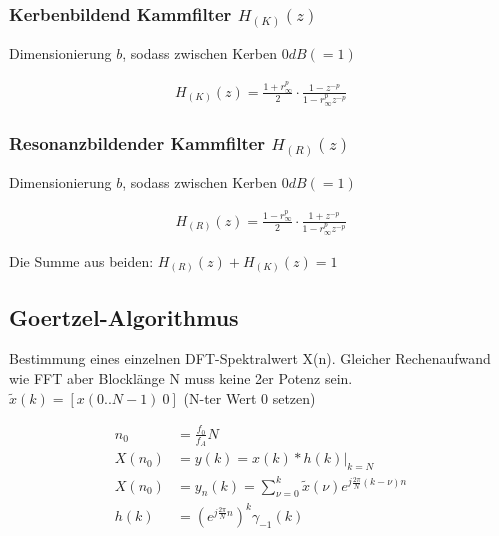 \documentclass[10pt,a4paper]{article}
\begin{document}
\subsubsection{Kerbenbildend Kammfilter $H_{(K)}(z)$}
Dimensionierung $b$, sodass zwischen Kerben $0dB(=1)$
  \begin{mdframed}[style=exercise]
    \begin{align}
        H_{(K)}(z)=\frac{1+r_\infty ^p}{2}\cdot \frac{1-z^{-p}}{1-r_\infty^p z^{-p}}
    \end{align}
  \end{mdframed}
\subsubsection{Resonanzbildender Kammfilter $H_{(R)}(z)$}
Dimensionierung $b$, sodass zwischen Kerben $0dB(=1)$
  \begin{mdframed}[style=exercise]
    \begin{align}
        H_{(R)}(z)= \frac{1-r_\infty ^p}{2}\cdot \frac{1+z^{-p}}{1-r_\infty^p z^{-p}}
    \end{align}
  \end{mdframed}
Die Summe aus beiden: $H_{(R)}(z) + H_{(K)}(z) = 1$



\subsection{Goertzel-Algorithmus}
Bestimmung eines einzelnen DFT-Spektralwert X(n). Gleicher Rechenaufwand wie FFT aber Blocklänge N muss keine 2er Potenz sein. $\tilde{x}(k)=[x(0..N-1) \ 0]$ (N-ter Wert 0 setzen)
  \begin{mdframed}[style=exercise]
    \begin{align}
        n_0 &= \frac{f_0}{f_A}N\\
        X(n_0)&= y(k)=x(k)*h(k)|_{k=N}\\
        X(n_0)&=y_n(k)=\sum_{\nu=0}^{k}\tilde{x}(\nu)e^{j\frac{2\pi}{N}(k-\nu)n}\\
        h(k) &= (e^{j\frac{2\pi}{N}n})^k \gamma_{-1}(k)
    \end{align}
  \end{mdframed}
\end{document}
